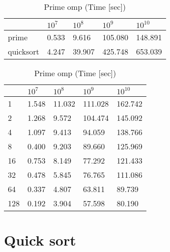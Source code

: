 \documentclass{article}
\begin{document}
\begin{table}[h!]
\begin{minipage}{0.48\textwidth}
\centering
\caption{Sequential execution (Time [sec])}
\label{my-label}
\begin{tabular}{lllll}
&      $10^7$           &    $10^8$    & $10^9$ &  $10^{10}$    \\ \hline
prime          &     0.533           &   9.616  & 105.080  & 148.891  \\ \hline
quicksort      &     4.247          &    39.907 & 425.748  & 653.039 \\
\end{tabular}
\end{minipage}%
\begin{minipage}{0.48\textwidth}
\centering
\caption{Prime omp (Time [sec])}
\label{my-label}
\begin{tabular}{l|llll}
&      $10^7$                             &    $10^8$    & $10^9$    &  $10^{10}$    \\ \hline
1       &       1.548                     &   11.032  & 111.028 & 162.742     \\ \hline
2       &       1.268                     &   9.572   & 104.474 & 145.092     \\ \hline
4       &       1.097                     &   9.413   & 94.059 &  138.766     \\ \hline
8       &       0.400                     &   9.203   & 89.660 &  125.969      \\ \hline
16       &      0.753                     &   8.149   & 77.292 &  121.433      \\ \hline
32       &      0.478                     &   5.845   & 76.765 &  111.086     \\ \hline
64       &      0.337                     &   4.807   & 63.811  & 89.739     \\ \hline
128       & \cellcolor[HTML]{34FF34}    0.192        & \cellcolor[HTML]{34FF34}  3.904   & \cellcolor[HTML]{34FF34} 57.598 & \cellcolor[HTML]{34FF34} 80.190     \\ 
\end{tabular}
\end{minipage}%
\end{table}

\pagebreak

\section{\textbf{Quick sort}} \\
\end{document}
